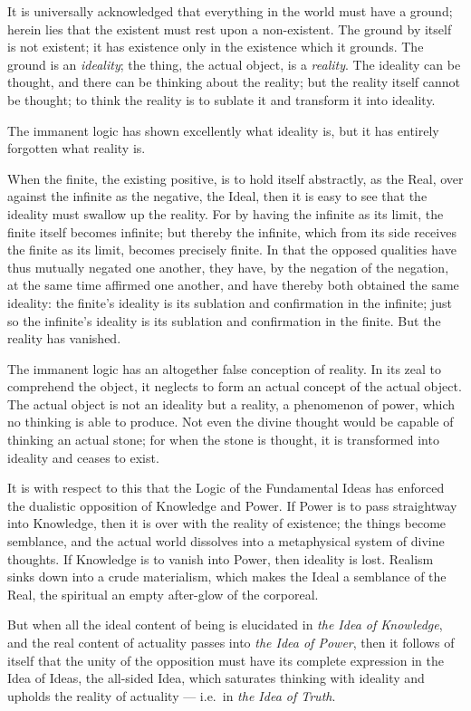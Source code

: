 \documentclass[12pt]{book}
\begin{document}
It is universally acknowledged that everything in the world must have
a ground; herein lies that the existent must rest upon a
non-existent. The ground by itself is not existent; it has existence
only in the existence which it grounds. The ground is an
\emph{ideality}; the thing, the actual object, is a \emph{reality}.
The ideality can be thought, and there can be thinking about the
reality; but the reality itself cannot be thought; to think the
reality is to sublate it and transform it into ideality.

The immanent logic has shown excellently what ideality is, but it has
entirely forgotten what reality is.

When the finite, the existing positive, is to hold itself abstractly,
as the Real, over against the infinite as the negative, the Ideal,
then it is easy to see that the ideality must swallow up the reality.
For by having the infinite as its limit, the finite itself becomes
infinite; but thereby the infinite, which from its side receives the
finite as its limit, becomes precisely finite. In that the opposed
qualities have thus mutually negated one another, they have, by the
negation of the negation, at the same time affirmed one another, and
have thereby both obtained the same ideality: the finite's ideality
is its sublation and confirmation in the infinite; just so the
infinite's ideality is its sublation and confirmation in the finite.
But the reality has vanished.

The immanent logic has an altogether false conception of reality. In
its zeal to comprehend the object, it neglects to form an actual
concept of the actual object. The actual object is not an ideality
but a reality, a phenomenon of power, which no thinking is able to
produce. Not even the divine thought would be capable of thinking an
actual stone; for when the stone is thought, it is transformed into
ideality and ceases to exist.

It is with respect to this that the Logic of the Fundamental Ideas
has enforced the dualistic opposition of Knowledge and Power. If
Power is to pass straightway into Knowledge, then it is over with the
reality of existence; the things become semblance, and the actual
world dissolves into a metaphysical system of divine thoughts. If
Knowledge is to vanish into Power, then ideality is lost. Realism
sinks down into a crude materialism, which makes the Ideal a
semblance of the Real, the spiritual an empty after-glow of the
corporeal.

But when all the ideal content of being is elucidated in \emph{the
Idea of Knowledge}, and the real content of actuality passes into
\emph{the Idea of Power}, then it follows of itself that the unity of
the opposition must have its complete expression in the Idea of
Ideas, the all-sided Idea, which saturates thinking with ideality and
upholds the reality of actuality --- i.e.\ in \emph{the Idea of
Truth}.
\end{document}
